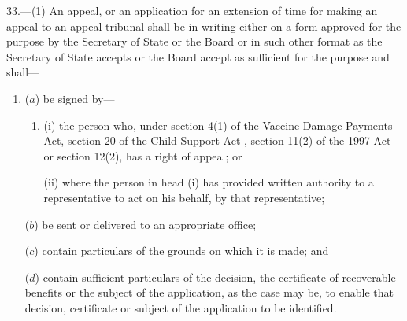 \documentclass[12pt,a4paper]{article}
\begin{document}
33.—(1) An appeal, or an application for an extension of time for making an appeal to an appeal tribunal shall be in writing either on a form approved for the purpose by the Secretary of State 
or the Board   %
or in such other format as the Secretary of State accepts 
or the Board accept   %
as sufficient for the purpose and shall—
\begin{enumerate}\item[]
($a$) be signed by—
\begin{enumerate}\item[]
(i) the person who, under 
section 4(1) of the Vaccine Damage Payments Act,  %
section 20 of the Child Support Act%
, section 11(2) of the 1997 Act or section 12(2), has a right of appeal; or

(ii) where the person in head (i) has provided written authority to a representative to act on his behalf, by that representative;
\end{enumerate}

($b$) be sent or delivered to an appropriate office;

($c$) contain particulars of the grounds on which it is made; and

($d$) contain sufficient particulars of the decision, the certificate of recoverable benefits or the subject of the application, as the case may be, to enable that decision, certificate or subject of the application to be identified.
\end{enumerate}
\end{document}
